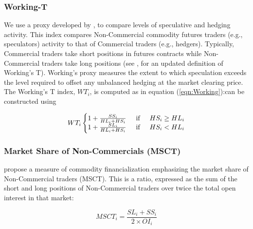 \documentclass[12pt]{article}
\begin{document}
\subsubsection{Working-T}
We use a proxy developed by \citet{working1960speculation}, to compare levels of speculative and hedging activity. This index compares Non-Commercial commodity futures traders (e.g., speculators) activity to that of Commercial traders (e.g., hedgers). Typically, Commercial traders take short positions in futures contracts while Non-Commercial traders take long positions (see \citet{shanker2017new}, for an updated definition of Working’s T). Working’s proxy measures the extent to which speculation exceeds the level required to offset any unbalanced hedging at the market clearing price. The Working's T index, $WT_i$, is computed as in equation (\ref{eqn:Working}):can be constructed using


\begin{equation} \label{eqn:Working}
WT_i\left\{\begin{matrix}
 1+\frac{SS_i}{HL_i+HS_i} \hspace{0.5cm} \mbox{if} \hspace{0.5cm} HS_i \ge HL_i\\
1+\frac{SL_i}{HL_i+HS_i} \hspace{0.5cm} \mbox{if} \hspace{0.5cm} HS_i < HL_i
\end{matrix}\right.
\end{equation}


\subsubsection{Market Share of Non-Commercials (MSCT)}
\citet{buyukcsahin2014speculators} propose a measure of commodity financialization emphasizing the market share of Non-Commercial traders (MSCT). This  is a ratio, expressed as  the sum of the short and long positions of Non-Commercial traders over twice the total open interest in that market: 



\begin{equation} \label{eqn:MSCT}
MSCT_i=\frac{SL_i+SS_i}{2 \times OI_i}
\end{equation}
\end{document}

